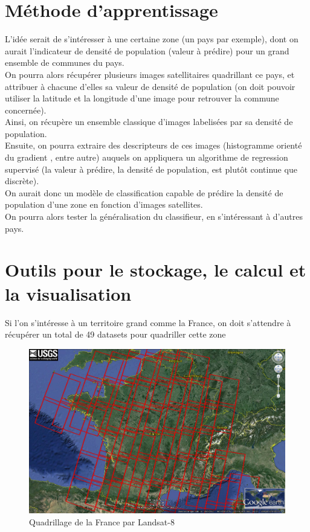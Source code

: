 \documentclass{book}
\begin{document}
\clearpage

\chapter{Méthode d'apprentissage}

L'idée serait de s'intéresser à une certaine zone (un pays par exemple), dont on aurait l'indicateur de densité de population (valeur 
à prédire) pour un grand ensemble de communes du pays.\\
On pourra alors récupérer plusieurs images satellitaires quadrillant ce pays, et attribuer à chacune d'elles
sa valeur de densité de population (on doit pouvoir utiliser la latitude et la longitude d'une image pour retrouver la commune concernée).\\
Ainsi, on récupère un ensemble classique d'images labelisées par sa densité de population.\\
Ensuite, on pourra extraire des descripteurs de ces images (histogramme orienté du gradient \cite{Dalal05histogramsof}, entre autre)
auquels on appliquera un algorithme de regression supervisé (la valeur à prédire, la densité de
population, est plut\^{o}t continue que discrète).\\
On aurait donc un modèle de classification capable de prédire la densité de population d'une zone en fonction d'images satellites.\\
On pourra alors tester la généralisation du classifieur, en s'intéressant à d'autres pays.\\

\chapter{Outils pour le stockage, le calcul et la visualisation}

Si l'on s'intéresse à un territoire grand comme la France, on doit s'attendre à récupérer un total de 49 datasets 
pour quadriller cette zone \cite{quadrillage}\\
\begin{figure}[H]
\begin{center}
\includegraphics[scale=0.25]{emrpise_france_landsat8.jpg}
\end{center}
\caption{Quadrillage de la France par Landsat-8 \cite{geosud}}
\label{quadrillage}
\end{figure}
\clearpage
\end{document}
